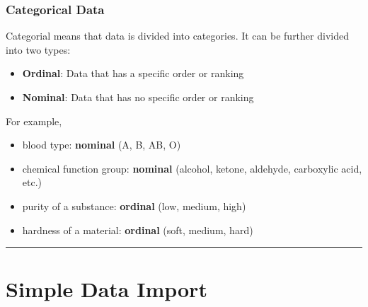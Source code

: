 \documentclass[
  letterpaper,
  DIV=11,
  numbers=noendperiod]{scrreprt}
\providecommand{\tightlist}{%
  \setlength{\itemsep}{0pt}\setlength{\parskip}{0pt}}\usepackage{longtable,booktabs,array}
\begin{document}
\subsection*{Categorical Data}\label{categorical-data}

Categorial means that data is divided into categories. It can be further
divided into two types:

\begin{itemize}
\tightlist
\item
  \textbf{Ordinal}: Data that has a specific order or ranking
\item
  \textbf{Nominal}: Data that has no specific order or ranking
\end{itemize}

For example,

\begin{itemize}
\tightlist
\item
  blood type: \textbf{nominal} (A, B, AB, O)
\item
  chemical function group: \textbf{nominal} (alcohol, ketone, aldehyde,
  carboxylic acid, etc.)
\item
  purity of a substance: \textbf{ordinal} (low, medium, high)
\item
  hardness of a material: \textbf{ordinal} (soft, medium, hard)
\end{itemize}

\begin{center}\rule{0.5\linewidth}{0.5pt}\end{center}

\begin{tcolorbox}[enhanced jigsaw, leftrule=.75mm, bottomrule=.15mm, colbacktitle=quarto-callout-note-color!10!white, title=\textcolor{quarto-callout-note-color}{\faInfo}\hspace{0.5em}{Quiz}, breakable, arc=.35mm, toptitle=1mm, opacityback=0, titlerule=0mm, coltitle=black, colback=white, opacitybacktitle=0.6, colframe=quarto-callout-note-color-frame, left=2mm, rightrule=.15mm, toprule=.15mm, bottomtitle=1mm]

\label{quiz-container}

\end{tcolorbox}

\chapter{Simple Data Import}\label{simple-data-import}
\end{document}
